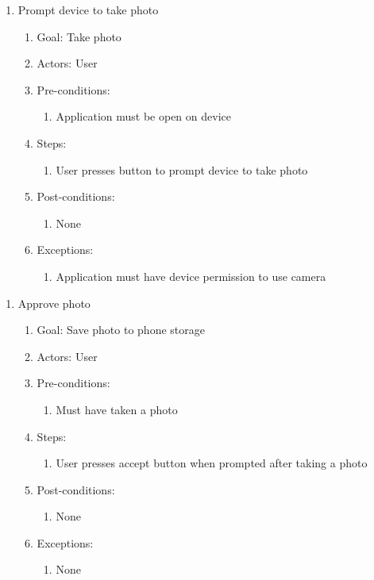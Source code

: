 \begin{enumerate}
    \item Prompt device to take photo
    \begin{enumerate}
        \item Goal: Take photo
        \item Actors: User
        \item Pre-conditions:
            \begin{enumerate}
                \item Application must be open on device
            \end{enumerate}
        \item Steps:
            \begin{enumerate}
                \item User presses button to prompt device to take photo
            \end{enumerate}
        \item Post-conditions:
            \begin{enumerate}
                \item None
            \end{enumerate}
        \item Exceptions:
            \begin{enumerate}
                \item Application must have device permission to use camera
            \end{enumerate}
    \end{enumerate}
\end{enumerate}

\begin{enumerate}
    \item Approve photo
    \begin{enumerate}
        \item Goal: Save photo to phone storage
        \item Actors: User
        \item Pre-conditions:
            \begin{enumerate}
                \item Must have taken a photo
            \end{enumerate}
        \item Steps:
            \begin{enumerate}
                \item User presses accept button when prompted after taking a photo
            \end{enumerate}
        \item Post-conditions:
            \begin{enumerate}
                \item None
            \end{enumerate}
        \item Exceptions:
            \begin{enumerate}
                \item None
            \end{enumerate}
    \end{enumerate}
\end{enumerate}

